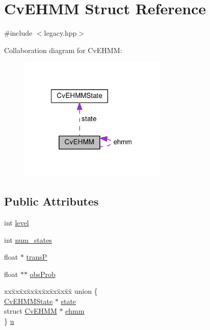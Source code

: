\hypertarget{structCvEHMM}{\section{Cv\-E\-H\-M\-M Struct Reference}
\label{structCvEHMM}
}


{\ttfamily \#include $<$legacy.\-hpp$>$}



Collaboration diagram for Cv\-E\-H\-M\-M\-:\nopagebreak
\begin{figure}[H]
\begin{center}
\leavevmode
\includegraphics[width=200pt]{structCvEHMM__coll__graph}
\end{center}
\end{figure}
\subsection*{Public Attributes}
\begin{DoxyCompactItemize}
\item 
int \hyperlink{structCvEHMM_aaa849276eb472066624aac17d07d363d}{level}
\item 
int \hyperlink{structCvEHMM_a76f8d6af057a30e38c7978ec3ca84f60}{num\-\_\-states}
\item 
float $\ast$ \hyperlink{structCvEHMM_a380235219abbd662f98358d9ae7095db}{trans\-P}
\item 
float $\ast$$\ast$ \hyperlink{structCvEHMM_a68625cb2d24219abe21121d038aa1cfb}{obs\-Prob}
\item 
\begin{tabbing}
xx\=xx\=xx\=xx\=xx\=xx\=xx\=xx\=xx\=\kill
union \{\\
\>\hyperlink{structCvEHMMState}{CvEHMMState} $\ast$ \hyperlink{structCvEHMM_a00849148e222b5fd626b39113651bc16}{state}\\
\>struct \hyperlink{structCvEHMM}{CvEHMM} $\ast$ \hyperlink{structCvEHMM_ab1429de105e03466a3f91e0a4fcfaf0e}{ehmm}\\
\} \hyperlink{structCvEHMM_a5a617a42b4d79f02f8b0d55ac0ba5106}{u}\\

\end{tabbing}\end{DoxyCompactItemize}


